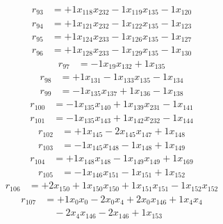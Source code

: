 \[\begin{aligned}
r_{93} &= + 1 x_{118} x_{232} - 1 x_{119} x_{135} - 1 x_{120}
\end{aligned}\]
\[\begin{aligned}
r_{94} &= + 1 x_{121} x_{232} - 1 x_{122} x_{135} - 1 x_{123}
\end{aligned}\]
\[\begin{aligned}
r_{95} &= + 1 x_{124} x_{233} - 1 x_{126} x_{135} - 1 x_{127}
\end{aligned}\]
\[\begin{aligned}
r_{96} &= + 1 x_{128} x_{233} - 1 x_{129} x_{135} - 1 x_{130}
\end{aligned}\]
\[\begin{aligned}
r_{97} &= - 1 x_{19} x_{132} + 1 x_{135}
\end{aligned}\]
\[\begin{aligned}
r_{98} &= + 1 x_{131} - 1 x_{133} x_{135} - 1 x_{134}
\end{aligned}\]
\[\begin{aligned}
r_{99} &= - 1 x_{135} x_{137} + 1 x_{136} - 1 x_{138}
\end{aligned}\]
\[\begin{aligned}
r_{100} &= - 1 x_{135} x_{140} + 1 x_{139} x_{231} - 1 x_{141}
\end{aligned}\]
\[\begin{aligned}
r_{101} &= - 1 x_{135} x_{143} + 1 x_{142} x_{232} - 1 x_{144}
\end{aligned}\]
\[\begin{aligned}
r_{102} &= + 1 x_{145} - 2 x_{145} x_{147} + 1 x_{148}
\end{aligned}\]
\[\begin{aligned}
r_{103} &= - 1 x_{145} x_{148} - 1 x_{148} + 1 x_{149}
\end{aligned}\]
\[\begin{aligned}
r_{104} &= + 1 x_{148} x_{148} - 1 x_{149} x_{149} + 1 x_{169}
\end{aligned}\]
\[\begin{aligned}
r_{105} &= - 1 x_{146} x_{151} - 1 x_{151} + 1 x_{152}
\end{aligned}\]
\[\begin{aligned}
r_{106} &= + 2 x_{150} + 1 x_{150} x_{150} + 1 x_{151} x_{151} - 1 x_{152} x_{152}
\end{aligned}\]
\[\begin{aligned}
r_{107} &= + 1 x_{0} x_{0} - 2 x_{0} x_{4} + 2 x_{0} x_{146} + 1 x_{4} x_{4} \\
 &\quad - 2 x_{4} x_{146} - 2 x_{146} + 1 x_{153}
\end{aligned}\]
